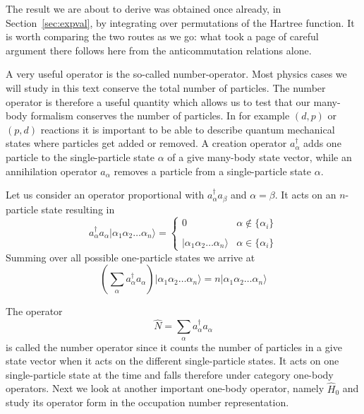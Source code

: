 The result we are about to derive was obtained once already, in
Section~\ref{sec:expval}, by integrating over permutations of the Hartree
function.  It is worth comparing the two routes as we go: what took a page of
careful argument there follows here from the anticommutation relations alone.


A very useful operator is the so-called number-operator.  Most physics cases  we will
study in this text conserve the total number of particles.  The number operator is therefore
a useful quantity which allows us to test that our many-body formalism  conserves the number of particles.
In for example $(d,p)$ or $(p,d)$ reactions it is important to be able to describe quantum mechanical states
where particles get added or removed.
A creation operator $a_\alpha^{\dagger}$ adds one particle to the single-particle state
$\alpha$ of a give many-body state vector, while an annihilation operator $a_\alpha$ 
removes a particle from a single-particle
state $\alpha$. 

Let us consider an operator proportional with $a_\alpha^{\dagger} a_\beta$ and 
$\alpha=\beta$. It acts on an $n$-particle state 
resulting in
\begin{equation}
	a_\alpha^{\dagger} a_\alpha |\alpha_1\alpha_2 \dots \alpha_{n}\rangle = 
	\begin{cases}
		0  &\alpha \notin \{\alpha_i\} \\
		\\
		|\alpha_1\alpha_2 \dots \alpha_{n}\rangle & \alpha \in \{\alpha_i\}
	\end{cases}
\end{equation}
Summing over all possible one-particle states we arrive at
\begin{equation}
	\left( \sum_\alpha a_\alpha^{\dagger} a_\alpha \right) |\alpha_1\alpha_2 \dots \alpha_{n}\rangle = 
	n |\alpha_1\alpha_2 \dots \alpha_{n}\rangle \label{eq:2-21}
\end{equation}

The operator 
\begin{equation}
	\hat{N} = \sum_\alpha a_\alpha^{\dagger} a_\alpha \label{eq:2-22}
\end{equation}
is called the number operator since it counts the number of particles in a give state vector when it acts 
on the different single-particle states.  It acts on one single-particle state at the time and falls 
therefore under category one-body operators.
Next we look at another important one-body operator, namely $\hat{H}_0$ and study its operator form in the 
occupation number representation.

